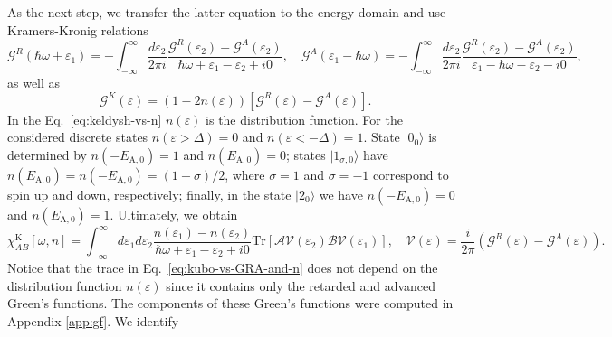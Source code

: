 \documentclass[aps,reprint,longbibliography, prb]{revtex4-2}
\begin{document}
As the next step, we transfer the latter equation to the energy domain and use Kramers-Kronig relations
\begin{equation}
\label{eq:GRA}
\mathcal{G}^{R}(\hbar\omega+\varepsilon_{1})=-\int_{-\infty}^{\infty}\frac{d\varepsilon_{2}}{2\pi i}\frac{\mathcal{G}^{R}(\varepsilon_{2})-\mathcal{G}^{A}(\varepsilon_{2})}{\hbar\omega+\varepsilon_{1}-\varepsilon_{2}+i0},\quad \mathcal{G}^{A}(\varepsilon_{1}-\hbar\omega)=-\int_{-\infty}^{\infty}\frac{d\varepsilon_{2}}{2\pi i}\frac{\mathcal{G}^{R}(\varepsilon_{2})-\mathcal{G}^{A}(\varepsilon_{2})}{\varepsilon_{1}-\hbar\omega-\varepsilon_{2}-i0},
\end{equation}
as well as
\begin{equation}
    \label{eq:keldysh-vs-n}
    \mathcal{G}^K(\varepsilon) = (1-2n(\varepsilon))\left[\mathcal{G}^{R}(\varepsilon)-\mathcal{G}^{A}(\varepsilon)\right].
\end{equation}
In the Eq.~\eqref{eq:keldysh-vs-n} $n(\varepsilon)$ is the distribution function. For the considered discrete states $n(\varepsilon>\Delta) = 0$ and $n(\varepsilon<-\Delta) = 1$. State $|0_0\rangle$ is determined by $n(-E_\mathrm{A,0}) = 1$ and $n(E_\mathrm{A,0}) = 0$; states $|1_{\sigma,0}\rangle$ have $n(E_\mathrm{A,0}) = n(- E_\mathrm{A,0}) = (1 + \sigma)/2$, where $\sigma = 1$ and $\sigma = -1$ correspond to spin up and down, respectively; finally, in the state $|2_0\rangle$ we have $n(-E_\mathrm{A,0}) = 0$ and $n(E_\mathrm{A,0}) = 1$. Ultimately, we obtain
\begin{equation}
\label{eq:kubo-vs-GRA-and-n}
\chi_{AB}^\mathrm{K}[\omega, n] = \int_{-\infty}^{\infty}d\varepsilon_{1}d\varepsilon_{2}\frac{n(\varepsilon_{1})-n(\varepsilon_{2})}{\hbar\omega+\varepsilon_{1}-\varepsilon_{2}+i0}\mathrm{Tr}\left[\mathcal{A}\mathcal{V}(\varepsilon_2)\mathcal{B}\mathcal{V}(\varepsilon_1)\right],\quad \mathcal{V}(\varepsilon)=\frac{i}{2\pi}(\mathcal{G}^{R}(\varepsilon)-\mathcal{G}^{A}(\varepsilon)).
\end{equation}
Notice that the trace in Eq.~\eqref{eq:kubo-vs-GRA-and-n} does not depend on the distribution function $n(\varepsilon)$ since it contains only the retarded and advanced Green's functions. The components of these Green's functions were computed in Appendix \ref{app:gf}. We identify
\end{document}
